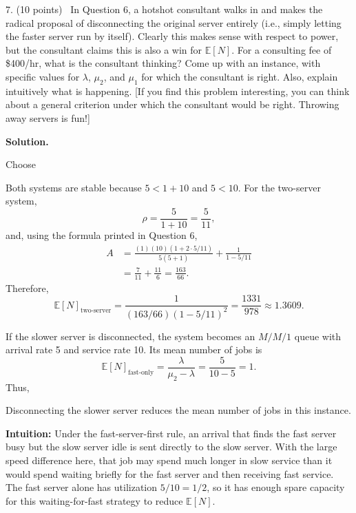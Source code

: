 \documentclass[11pt,letterpaper]{article}
\newenvironment{examquestion}[2]{%
  \clearpage
  \begin{list}{}{%
    \setlength{\leftmargin}{2.15em}%
    \setlength{\labelwidth}{1.55em}%
    \setlength{\labelsep}{0.60em}%
    \setlength{\itemindent}{0pt}%
    \setlength{\listparindent}{0pt}%
    \setlength{\parsep}{0.42em}%
    \setlength{\topsep}{0pt}%
  }
  \item[\hfill #1.] (#2 points)\ 
}{%
  \end{list}
}
\newenvironment{solution}{%
  \par\medskip
  \color{red}
  \noindent\textbf{Solution.}\par
}{%
  \par
  \color{black}
}
\newcommand{\E}{\mathbb{E}}
\newcommand{\answerbox}[1]{%
  \par\smallskip\begingroup
  \setlength{\fboxsep}{4pt}%
  \setlength{\fboxrule}{0.7pt}%
  \noindent\makebox[\linewidth][c]{\fbox{$\displaystyle #1$}}%
  \par\endgroup\smallskip
}
\begin{document}
\begin{examquestion}{7}{10}
In Question 6, a hotshot consultant walks in and makes the radical proposal of
disconnecting the original server entirely (i.e., simply letting the faster server run
by itself). Clearly this makes sense with respect to power, but the consultant claims
this is also a win for $\E[N]$. For a consulting fee of \$400/hr, what is the
consultant thinking? Come up with an instance, with specific values for $\lambda$,
$\mu_2$, and $\mu_1$ for which the consultant is right. Also, explain intuitively what
is happening. [If you find this problem interesting, you can think about a general
criterion under which the consultant would be right. Throwing away servers is fun!]

\begin{solution}
Choose
\answerbox{
\lambda=5,
\qquad
\mu_1=1,
\qquad
\mu_2=10
}
Both systems are stable because $5<1+10$ and $5<10$. For the two-server system,
\[
\rho=\frac{5}{1+10}=\frac5{11},
\]
and, using the formula printed in Question 6,
\[
\begin{aligned}
A
&=\frac{(1)(10)(1+2\cdot5/11)}{5(5+1)}+\frac{1}{1-5/11}\\
&=\frac7{11}+\frac{11}{6}=\frac{163}{66}.
\end{aligned}
\]
Therefore,
\[
\E[N]_{\text{two-server}}
=\frac{1}{(163/66)(1-5/11)^2}
=\frac{1331}{978}
\approx1.3609.
\]

If the slower server is disconnected, the system becomes an $M/M/1$ queue with
arrival rate 5 and service rate 10. Its mean number of jobs is
\[
\E[N]_{\text{fast-only}}
=\frac{\lambda}{\mu_2-\lambda}
=\frac{5}{10-5}=1.
\]
Thus,
\answerbox{
\E[N]_{\text{fast-only}}=1
<\frac{1331}{978}
=\E[N]_{\text{two-server}}
}
Disconnecting the slower server reduces the mean number of jobs in this instance.

\textbf{Intuition:} Under the fast-server-first rule, an arrival that finds the fast
server busy but the slow server idle is sent directly to the slow server. With the
large speed difference here, that job may spend much longer in slow service than it
would spend waiting briefly for the fast server and then receiving fast service. The
fast server alone has utilization $5/10=1/2$, so it has enough spare capacity for this
waiting-for-fast strategy to reduce $\E[N]$.
\end{solution}
\end{examquestion}

\label{LastPage}
\thispagestyle{lastpage}
\end{document}
